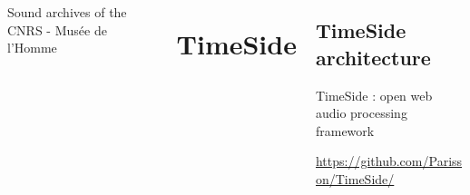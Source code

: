 \documentclass[final, hyperref, table]{beamer}
\begin{document}
\begin{frame}[containsverbatim]{}
\begin{columns}[T]
\begin{column}[T]{.49\linewidth}
\begin{block}{Sound archives of the CNRS - Musée de l'Homme}

      \end{block}
      
      
    \end{column}
\section{TimeSide}
\begin{column}[T]{.49\linewidth}
\subsection{TimeSide architecture}
  \begin{block}{TimeSide : open web audio processing framework}

\begin{beamerboxesrounded}%
        [upper=red, shadow=true]%
        {}
  \url{https://github.com/Parisson/TimeSide/}
   \end{beamerboxesrounded}


\end{block}
\end{column}
\end{columns}
\end{frame}
\end{document}
